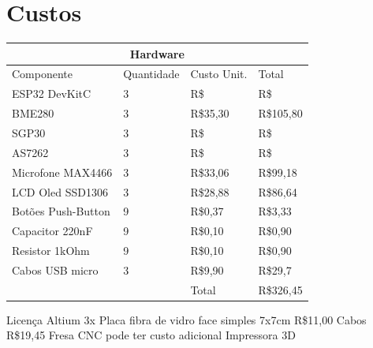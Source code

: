 \documentclass[../monografia.tex]{subfiles}
\begin{document}
\section{Custos}

\begin{tabular}{ |p{4.5cm}|p{2cm}|p{3cm}|p{3cm}|  }
	\hline
	\multicolumn{4}{|c|}{Hardware} \\
	\hline
	\hline
	Componente & Quantidade & Custo Unit. & Total\\
	\hline
	ESP32 DevKitC & 3 & R\$ & R\$ \\
	BME280 & 3 & R\$35,30 & R\$105,80 \\
	SGP30 & 3 & R\$ & R\$ \\
	AS7262 & 3 & R\$ & R\$ \\
	Microfone MAX4466 & 3 & R\$33,06 & R\$99,18 \\
	LCD Oled SSD1306 & 3 & R\$28,88 & R\$86,64 \\
	Botões Push-Button & 9 & R\$0,37 & R\$3,33 \\
	Capacitor 220nF & 9 & R\$0,10 & R\$0,90 \\
	Resistor 1kOhm & 9 & R\$0,10 & R\$0,90 \\
	Cabos USB micro & 3 & R\$9,90 & R\$29,7 \\
	\hline
	\multicolumn{2}{|c|}{ } & Total & R\$326,45 \\
	\hline
\end{tabular}

Licença Altium 
3x Placa fibra de vidro face simples 7x7cm R\$11,00
Cabos R\$19,45
Fresa CNC pode ter custo adicional
Impressora 3D 
\end{document}
